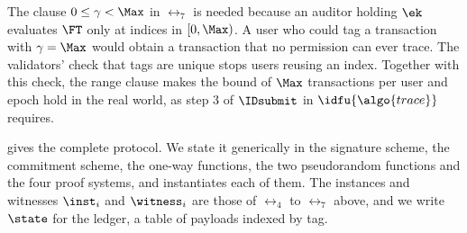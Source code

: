 The clause $0 \leq \gamma < \Max$ in $\rel_7$ is needed because an auditor
holding $\ek$ evaluates $\FT$ only at indices in $[0,\Max)$. A user who could tag
a transaction with $\gamma = \Max$ would obtain a transaction that no permission
can ever trace. The validators' check that tags are unique stops users reusing an index.
Together with this check, the range clause makes the bound of $\Max$
transactions per user and epoch hold in the real world, as step 3 of $\IDsubmit$
in $\idfu{\algo{trace}}$ requires.

 gives the complete protocol. We state it
generically in the signature scheme, the commitment scheme, the one-way
functions, the two pseudorandom functions and the four proof systems, and
 instantiates each of them. The instances and
witnesses $\inst_i$ and $\witness_i$ are those of $\rel_4$ to $\rel_7$ above,
and we write $\state$ for the ledger, a table of payloads indexed by tag.

